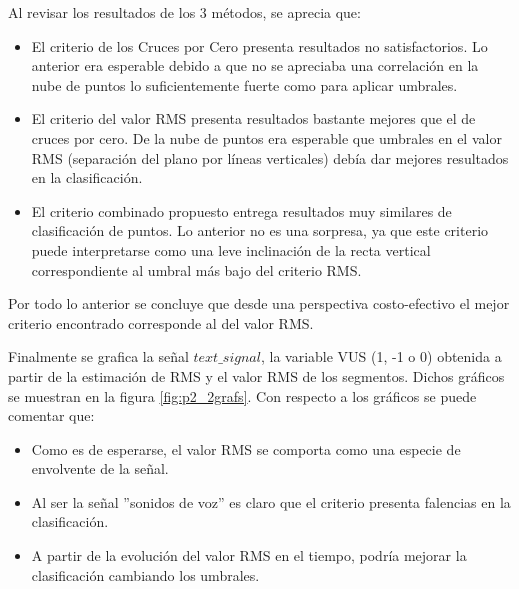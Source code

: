 Al revisar los resultados de los 3 métodos, se aprecia que:
\begin{itemize}
    \item El criterio de los Cruces por Cero presenta resultados no satisfactorios. Lo anterior era esperable debido a que no se apreciaba una correlación en la nube de puntos lo suficientemente fuerte como para aplicar umbrales.
    \item El criterio del valor RMS presenta resultados bastante mejores que el de cruces por cero. De la nube de puntos era esperable que umbrales en el valor RMS (separación del plano por líneas verticales) debía dar mejores resultados en la clasificación.
    \item El criterio combinado propuesto entrega resultados muy similares de clasificación de puntos. Lo anterior no es una sorpresa, ya que este criterio puede interpretarse como una leve inclinación de la recta vertical correspondiente al umbral más bajo del criterio RMS.
\end{itemize}

Por todo lo anterior se concluye que desde una perspectiva costo-efectivo el mejor criterio encontrado corresponde al del valor RMS. 





Finalmente se grafica la señal $text\_signal$, la variable VUS (1, -1 o 0) obtenida a partir de la estimación de RMS y el valor RMS de los segmentos. Dichos gráficos se muestran en la figura \ref{fig:p2_2grafs}. Con respecto a los gráficos se puede comentar que:
\begin{itemize}
    \item Como es de esperarse, el valor RMS se comporta como una especie de envolvente de la señal.
    \item Al ser la señal ''sonidos de voz'' es claro que el criterio presenta falencias en la clasificación.
    \item A partir de la evolución del valor RMS en el tiempo, podría mejorar la clasificación cambiando los umbrales.
\end{itemize}

